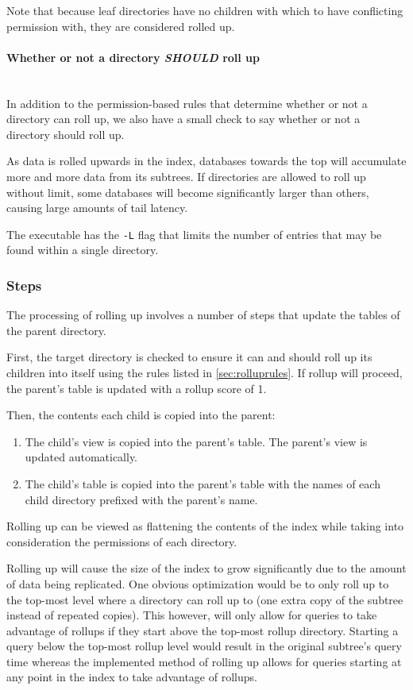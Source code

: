 Note that because leaf directories have no children with which to have
conflicting permission with, they are considered rolled up.

\paragraph{Whether or not a directory {\it SHOULD} roll up} ~\\
In addition to the permission-based rules that determine whether or
not a directory can roll up, we also have a small check to say whether
or not a directory should roll up.

As data is rolled upwards in the index, databases towards the top will
accumulate more and more data from its subtrees. If directories are
allowed to roll up without limit, some databases will become
significantly larger than others, causing large amounts of tail
latency.

The \gufirollup executable has the \texttt{-L} flag that limits the number
of entries that may be found within a single directory.

\subsubsection{Steps}
The processing of rolling up involves a number of steps that update
the tables of the parent directory.

First, the target directory is checked to ensure it can and should
roll up its children into itself using the rules listed in
\ref{sec:rolluprules}. If rollup will proceed, the parent's \summary table
is updated with a rollup score of 1.

Then, the contents each child is copied into the parent:

\begin{enumerate}
\item The child's \pentries view is copied into the parent's
  \pentriesrollup table. The parent's \pentries view is updated
  automatically.
\item The child's \summary table is copied into the parent's \summary
  table with the names of each child directory prefixed with the parent's
  name.
\end{enumerate}

Rolling up can be viewed as flattening the contents of the index while
taking into consideration the permissions of each directory.

Rolling up will cause the size of the index to grow significantly due
to the amount of data being replicated. One obvious optimization would
be to only roll up to the top-most level where a directory can roll up
to (one extra copy of the subtree instead of repeated copies). This
however, will only allow for queries to take advantage of rollups if
they start above the top-most rollup directory. Starting a query below
the top-most rollup level would result in the original subtree's query
time whereas the implemented method of rolling up allows for queries
starting at any point in the index to take advantage of rollups.

